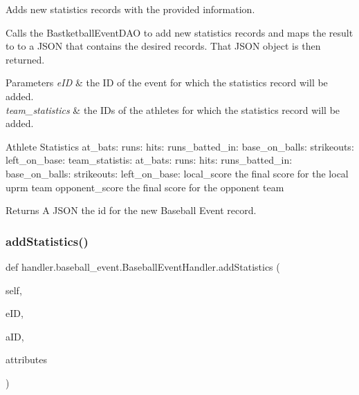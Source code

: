 Adds new statistics records with the provided information. 

Calls the Bastketball\+Event\+D\+AO to add new statistics records and maps the result to to a J\+S\+ON that contains the desired records. That J\+S\+ON object is then returned.


\begin{DoxyParams}{Parameters}
{\em e\+ID} & the ID of the event for which the statistics record will be added. \\
\hline
{\em team\+\_\+statistics} & the I\+Ds of the athletes for which the statistics record will be added.\\
\hline
\end{DoxyParams}
\begin{DoxyParagraph}{Athlete Statistics}
at\+\_\+bats\+: runs\+: hits\+: runs\+\_\+batted\+\_\+in\+: base\+\_\+on\+\_\+balls\+: strikeouts\+: left\+\_\+on\+\_\+base\+: team\+\_\+statistis\+: at\+\_\+bats\+: runs\+: hits\+: runs\+\_\+batted\+\_\+in\+: base\+\_\+on\+\_\+balls\+: strikeouts\+: left\+\_\+on\+\_\+base\+: local\+\_\+score the final score for the local uprm team opponent\+\_\+score the final score for the opponent team
\end{DoxyParagraph}
\begin{DoxyReturn}{Returns}
A J\+S\+ON the id for the new Baseball Event record. 
\end{DoxyReturn}
\mbox{\label{classhandler_1_1baseball__event_1_1_baseball_event_handler_aa6636546cf97f1303fba6eb4cc3888d1}} 
\subsubsection{\texorpdfstring{add\+Statistics()}{addStatistics()}}
{\footnotesize\ttfamily def handler.\+baseball\+\_\+event.\+Baseball\+Event\+Handler.\+add\+Statistics (\begin{DoxyParamCaption}\item[{}]{self,  }\item[{}]{e\+ID,  }\item[{}]{a\+ID,  }\item[{}]{attributes }\end{DoxyParamCaption})}



